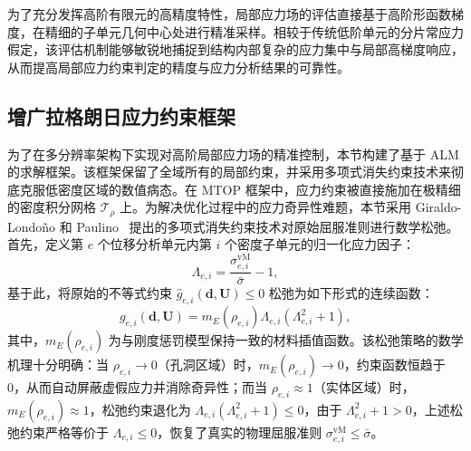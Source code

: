 为了充分发挥高阶有限元的高精度特性，局部应力场的评估直接基于高阶形函数梯度，在精细的子单元几何中心处进行精准采样。相较于传统低阶单元的分片常应力假定，该评估机制能够敏锐地捕捉到结构内部复杂的应力集中与局部高梯度响应，从而提高局部应力约束判定的精度与应力分析结果的可靠性。


\subsection{增广拉格朗日应力约束框架}
\label{subsec:alm_stress_constraint}

为了在多分辨率架构下实现对高阶局部应力场的精准控制，本节构建了基于 ALM 的求解框架。该框架保留了全域所有的局部约束，并采用多项式消失约束技术来彻底克服低密度区域的数值病态。在 MTOP 框架中，应力约束被直接施加在极精细的密度积分网格 $\mathcal{T}_\rho$ 上。为解决优化过程中的应力奇异性难题，本节采用 Giraldo-Londoño 和 Paulino~\cite{giraldo-londonoUnifiedApproachTopology2020} 提出的多项式消失约束技术对原始屈服准则进行数学松弛。首先，定义第 $e$ 个位移分析单元内第 $i$ 个密度子单元的归一化应力因子：
\[
\Lambda_{e,i} = \frac{\sigma_{e,i}^{\text{vM}}}{\bar{\sigma}} - 1,
\]
基于此，将原始的不等式约束  $\hat{g}_{e,i}(\boldsymbol{d}, \boldsymbol{U}) \le 0$ 松弛为如下形式的连续函数：
\begin{equation} 
	g_{e,i}(\boldsymbol{d}, \boldsymbol{U}) = m_E(\rho_{e,i})\Lambda_{e,i}(\Lambda_{e,i}^2 + 1),
	\label{eq:ch4_poly_restrict_func}
\end{equation}
其中，$m_E(\rho_{e,i})$ 为与刚度惩罚模型保持一致的材料插值函数。该松弛策略的数学机理十分明确：当 $\rho_{e,i} \to 0$（孔洞区域）时，$m_E(\rho_{e,i}) \to 0$，约束函数恒趋于 0，从而自动屏蔽虚假应力并消除奇异性；而当 $\rho_{e,i} \approx 1$（实体区域）时，$m_E(\rho_{e,i}) \approx 1$，松弛约束退化为 $\Lambda_{e,i}(\Lambda_{e,i}^2 + 1) \le 0$，由于 $\Lambda_{e,i}^2 + 1 > 0$，上述松弛约束严格等价于 $\Lambda_{e,i} \le 0$，恢复了真实的物理屈服准则 $\sigma_{e,i}^{\text{vM}} \le \bar{\sigma}$。

